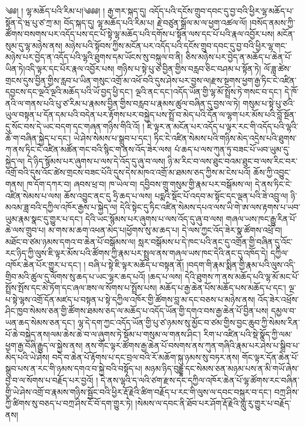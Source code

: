 \setcounter{footnote}{0} 
༄༅། ། ལྷ་མཆོད་པའི་རིམ་པ།༄༅༅། ། རྒྱ་གར་སྐད་དུ། འདོད་པའི་དངོས་གྲུབ་དབང་དུ་བྱ་བའི་ཕྱིར་ལྷ་མཆོད་པ་སྟོན་དེ་ཝ་པུ་ཙ་ཀྲ་མ། བོད་སྐད་དུ། ལྷ་མཆོད་པའི་རིམ་པ། རྗེ་བཙུན་སྒྲོལ་མ་ལ་ཕྱག་འཚལ་ལོ། །བསོད་ནམས་ཀྱི་ཚོགས་བསགས་པར་འདོད་པས་དང་པོ་སྟེ་ལྷ་མཆོད་པའི་དགོས་པ་སྟོན་ལས་དང་པོ་པའི་རྣལ་འབྱོར་པས། མངོན་སུམ་དུ་ལྷ་མཉེས་ནས། མཉེས་པའི་སྟོབས་ཀྱིས་མངོན་པར་འདོད་པའི་དངོས་གྲུབ་དབང་དུ་བྱ་བའི་ཕྱིར་ལྷ་གང་མཉེས་པར་བྱེད་ན་འདོད་པའི་ལྷའི་ཐུགས་དམ་ཡོངས་སུ་བསྐུལ་བ་ནི། ཅིས་མཉེས་པར་བྱེད་ན་མཆོད་པ་ཆེན་པོ་ཡིན་ཏེ།འདི་ལྟར་དང་པོར་རྣལ་འབྱོར་པས། གཉིས་པ་སྟེ་པུ་ཙ་བྱིན་གྱིས་བརླབ་ཅིང་བཤམ་པ་སྟོན་ཏེ། ལོ་ཟླ་ཚེས་གྲངས་དུས་བྱིན་གྱིས་རླབ་པ་ཡིན་གསུང་འགྲོ་མ་འཕོ་བའི་དུས་ཤེས་པར་བྱས་ལ།རྫས་སྔགས་ཕྱག་རྒྱ་ཏིང་ངེ་འཛིན་དབྱངས་དང་ལྔའོ་ལྔའི་མཆོད་པའི་ཡོ་བྱད་ཕྱི་དང་། ལྔའི་ནང་དང་།འདོད་ཡོན་གྱི་ལྷ་མོ་སྤྲོས་ཏེ་གསང་བ་དང་། དེ་ཁོ་ནའི་ལ་གནས་པའི་པུ་ཙ་རིམ་པ་རྣམས་བྱིན་གྱིས་བརླབ་པ་རྣམས་ཚུལ་བཞིན་དུ་བྱས་ལ་ཏེ། གསུམ་པ་སྟེ་པུ་ཙའི་ཡུལ་བསྟན་པ་དོན་དམ་པའི་བདེན་པར་རྟོགས་པར་བསྐྱེད་པས་སྤྲོ་བ་མེད་པའི་དོན་ལ་ལྷག་པར་མོས་པའི་བློ་སྔོན་དུ་སོང་བས་དེ་ཡང་བདག་དང་གཞན་གཉིས་གིའི་འོ། ། ཇི་ལྟར་ན་མངོན་པར་འདོད་པ་ལྟར་རང་གི་འདོད་པའི་ལྷའི་ཆོ་ག་བཞིན་སྐྱེད་པ་དང་། ཡེ་ཤེས་སེམས་པ་སྒྲུབ་པ་དང་། ཏིང་ངེ་འཛིན་སེམས་པའི་གཉིས་མེད་འདྲེས་པའི་ཐུགས་ཀ་ནས་ཏིང་ངེ་འཛིན་མཚོན་གང་བའི་སྙིང་ག་ནས་འོད་ཟེར་ལས། པཾ་ཆད་པ་ལས་ཀུན་ཏུ་བཟང་པོ་ཡབ་ཡུམ་དུ་སྐྱེད་ལ། དེ་ཉིད་སྙོམས་པར་ཞུགས་པ་ལས་དེ་འོད་དུ་ཞུ་བ་ལས། ཉི་མ་རིང་བ་ལས་ཐུང་བའམ་ཐུང་བ་ལས་རིང་བར་འགྲོ་བའི་དུས་འོང་ཚེས་གྲངས་བཟང་པོའི་དུས་དེས་མཁའ་འགྲོ་མ་ཐམས་ཅད་ཀྱིས་མ་ངེས་པའོ། ཆོས་ཀྱི་འབྱུང་གནས། ཁ་དོག་དཀར་བ། ཞབས་ཕྲ་བ། ཁ་ཡེལ་བ། དབྱིབས་གྲུ་གསུམ་གྱི་རྣམ་པར་བསྒོམས་ལ། དེ་ནས་ཏིང་ངེ་འཛིན་སེམས་པ་ལས། ཆོས་འབྱུང་ནང་དུ ཧྲི་ཆད་པ་ལས། པདྨའི་སྡོང་པོ་འདབ་མ་སྟོང་དང་ལྡན་པའི་ཟེ་འབྲུ་ལ། ཉི་མའམ་ཟླ་བའི་དཀྱིལ་འཁོར་རྒྱས་པ་སྐྱེད་ལ། དེའི་སྟེང་དུ་ཏིང་འཛིན་སེམས་དཔའ་ལས་ཡི་གེ་ཨ་ལས་རྟགས་པ་ཡབ་ཡུམ་རྣམ་སྣང་དུ་གྱུར་པ་དང་། དེའི་ཡང་སྙོམས་པར་ཞུགས་པ་ལས་འོད་དུ་ཞུ་བ་ལས། གཞལ་ཡས་ཁང་རྒྱུ་རིན་པོ་ཆེ་ལས་གྲུབ་པ། མ་གས་མ་ཆག་འཕན་མེད་པ།ཕྱོགས་སུ་མ་ཆད་པ། དེ་ལས་ཀྱང་འོད་ཟེར་སྣ་ཚོགས་འཕྲོ་བ། མཐོང་བ་ཙམ་ཉམས་དགའ་བ་ཆེན་པོ་བསྒོམས་ལ། སླར་བསྒོམས་པ་དེ་ཁང་པའི་ནང་དུ་འགྲོན་གྱི་བཞིན་དུ་འོང་རང་ཉིད་ཀྱི་ལུས་ཇི་ལྟར་མོས་པའི་ཚོགས་ཀྱི་རྣམ་པར་སྤྲུལ་ནས་གཞལ་ཡས་ཁང་དེའི་ནང་དུ་འཁོད་དེ། དཀྱིལ་འཁོར་ཆེན་པོར་གྱུར་པ་དང་། ། བཞི་པ་སྟེ་ཇི་ལྟར་མཆོད་པ་བསྟན་ནོ། །བདག་གི་རྣམ་སྨིན་གྱི་རྣམ་པའི་ལུས་འདི་གྲིབ་མའི་ཚུལ་དུ་ལོགས་སུ་ཆད་པ་ཡང་ལྷར་ཆད་པའོ། །ཆད་པ་ལས། དེའི་ཐུགས་ཀ་ནས་མཆོད་པའི་ལྷ་མོ་མང་པོ་སྤྲོས་སྤོས་དང་མེ་ཏོག་དང་ཞལ་ཟས་ལ་སོགས་པ་སྤྲོས་པས། མཆོད་པ་རྒྱ་ཆེན་པོས་མཆོད་པས་མཆོད་པ་དང་། ལྔ་པ་སྟེ་ལྷས་འགྲོ་དོན་མཛད་པ་བསྟན་པ་སྟེ་དཀྱིལ་འཁོར་གྱི་ཚོགས་བླ་མ་དང་བཅས་པ་མཉེས་ནས། འོད་ཟེར་འཕྲོས་ཤིང་ཁྱབ་སེམས་ཅན་གྱི་ཚོགས་ཐམས་ཅད་ལ་མཆོད་པ་འདོད་ཡོན་གྱི་དགའ་བས་རྒྱ་ཆེན་པོ་བྱིན་པས། དམྱལ་བ་ཡན་ཆད་སེམས་ཅན་དང་། ལྷ་དེ་དག་ཀྱང་འདོད་ཡོན་གྱི་པུ་ཙ་ཉམས་སུ་མྱོང་བ་ཙམ་གྱིས་བྱང་ཆུབ་ཀྱི་སེམས་རིན་པོ་ཆེ་བསྐྱེད་ནས།ལམ་ཆེས་ཆེ་བ་ལ་ཞུགས་ཏེ་སྡོམ་པ་གསུམ་ལ་གནས་ཤིང་། རིག་པ་འཛིན་པའི་སྡེ་སྣོད་ཀྱི་ལམ་ཕྱག་རྒྱ་བཞི་རྒྱུད་ལ་སྐྱེས་ནས། ནས་གོང་ལྟར་ཚོགས་རྒྱ་ཆེན་པོ་བསགས་ནས་ཀུན་གཞིའི་རྣམ་པར་ཤེས་པ་སྒྲིབ་པ་མེད་པའི་ཡེ་ཤེས། བདེ་བ་ཆེན་པོ་རྟོགས་པ་དང་བྲལ་བའི་རོ་མཆོག་སྐུ་ཉམས་སུ་བཏར་ནས། གོང་ལྟར་དོན་ཆེན་པོ་སྒྲུབ་པས་ན་རང་གི་ཉམས་དགའ་བ་སྐྱེ་བའི་བསྟོད་པ། མཉམ་ཉིད་བུདྡྷ་དང་སེམས་ཅན་མཉམ་པས་ན་མི་གཡོ་ཞེས་བྱ་བ་ལ་སོགས་པ་བརྗོད་པར་བྱའོ། ། དེ་ནས་ལྷའི་ད་ལའི་ཙག་རྫས་དང་དཀྱིལ་འཁོར་ཆེན་པོ་ལྷ་ཚོགས་རང་བཞིན་གྱི་ཡེ་ཤེས་འགྲོ་བ་རྣམས་གཉིས་སྦྱོང་བའི་ཕྱིར་རྡོ་རྗེའི་ཚིག་བརྗོད་པ་རང་གི་ལུས་ལ་དབང་བསྐུར་བ་དང་། བཀྲ་ཤིས་ཀྱི་ཚིགས་སུ་བཅད་པ་བཀྲ་ཤིས་ངོ་བོ་དག་གྱུར་ཏེ། །སེམས་ལ་དབང་ནི་ཐོབ་པར་ཤོག་རྡོ་རྗེའི་གླུ་རུ་གྱུར་པ་བརྗོད་ནས། 